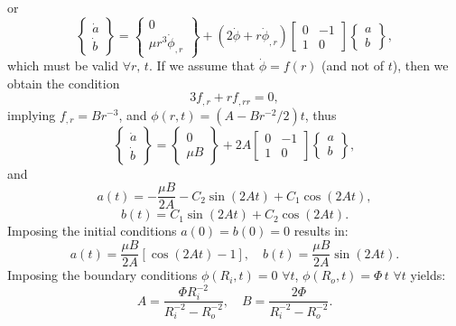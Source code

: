 \documentclass[12pt]{article}
\begin{document}
or
\begin{equation}
  \left\{ \begin{array}{c} \dot{a} \\ \dot{b} \end{array} \right\} = \left\{ \begin{array}{c} 0 \\ \mu r^3 \dot{\phi}_{,r} \end{array} \right\} + (2 \dot{\phi} + r \dot{\phi}_{,r}) \left[ \begin{array}{cc} 0 & -1 \\ 1 & 0 \end{array} \right] \left\{ \begin{array}{c} a \\ b \end{array} \right\},
\end{equation}
which must be valid $\forall r, \, t$. If we assume that $\dot{\phi} = f(r)$ (and not of $t$), then we obtain the condition
\begin{equation}
  3 f_{,r} + r f_{,rr} = 0,
\end{equation}
implying $f_{,r} = B r^{-3}$, and $\phi (r, t) = (A - B r^{-2} / 2)t$, thus
\begin{equation}
  \left\{ \begin{array}{c} \dot{a} \\ \dot{b} \end{array} \right\} = \left\{ \begin{array}{c} 0 \\ \mu B \end{array} \right\} + 2 A \left[ \begin{array}{cc} 0 & -1 \\ 1 & 0 \end{array} \right] \left\{ \begin{array}{c} a \\ b \end{array} \right\},
\end{equation}
and
\begin{equation}
  a(t) = - \frac{\mu B}{2 A} - C_2 \sin (2 A t) + C_1 \cos (2 A t),
\end{equation}
\begin{equation}
  b(t) = C_1 \sin (2 A t) + C_2 \cos (2 A t).
\end{equation}
Imposing the initial conditions $a(0) = b(0) = 0$ results in:
\begin{equation}
  a(t) = \frac{\mu B}{2 A} \left[ \cos (2 A t) - 1 \right], \quad b(t) = \frac{\mu B}{2 A} \sin (2 A t).
\end{equation}
Imposing the boundary conditions $\phi(R_i,t) = 0 \, \, \forall t$, $\phi(R_o,t) = \Phi \, t \, \, \forall t$ yields:
\begin{equation}
  A = \frac{\Phi R_i^{-2}}{R_i^{-2} - R_o^{-2}}, \quad B = \frac{2 \Phi}{R_i^{-2} - R_o^{-2}}.
\end{equation}
\end{document}

